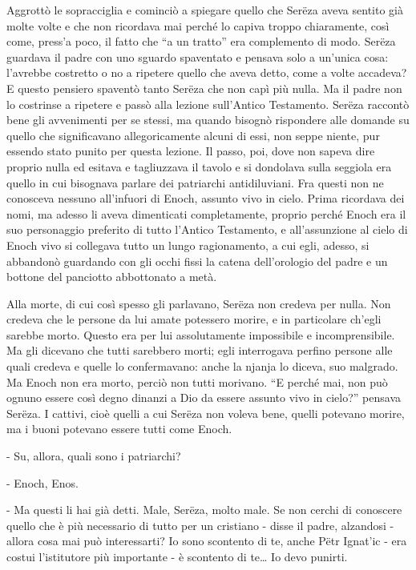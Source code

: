 Aggrottò le sopracciglia e cominciò a spiegare quello che Serëza aveva sentito già molte volte e che non ricordava mai perché lo capiva troppo chiaramente, così come, press'a poco, il fatto che ``a un tratto'' era complemento di modo. Serëza guardava il padre con uno sguardo spaventato e pensava solo a un'unica cosa: l'avrebbe costretto o no a ripetere quello che aveva detto, come a volte accadeva? E questo pensiero spaventò tanto Serëza che non capì più nulla. Ma il padre non lo costrinse a ripetere e passò alla lezione sull'Antico Testamento. Serëza raccontò bene gli avvenimenti per se stessi, ma quando bisognò rispondere alle domande su quello che significavano allegoricamente alcuni di essi, non seppe niente, pur essendo stato punito per questa lezione. Il passo, poi, dove non sapeva dire proprio nulla ed esitava e tagliuzzava il tavolo e si dondolava sulla seggiola era quello in cui bisognava parlare dei patriarchi antidiluviani. Fra questi non ne conosceva nessuno all'infuori di Enoch, assunto vivo in cielo. Prima ricordava dei nomi, ma adesso li aveva dimenticati completamente, proprio perché Enoch era il suo personaggio preferito di tutto l'Antico Testamento, e all'assunzione al cielo di Enoch vivo si collegava tutto un lungo ragionamento, a cui egli, adesso, si abbandonò guardando con gli occhi fissi la catena dell'orologio del padre e un bottone del panciotto abbottonato a metà. 

Alla morte, di cui così spesso gli parlavano, Serëza non credeva per nulla. Non credeva che le persone da lui amate potessero morire, e in particolare ch'egli sarebbe morto. Questo era per lui assolutamente impossibile e incomprensibile. Ma gli dicevano che tutti sarebbero morti; egli interrogava perfino persone alle quali credeva e quelle lo confermavano: anche la njanja lo diceva, suo malgrado. Ma Enoch non era morto, perciò non tutti morivano. ``E perché mai, non può ognuno essere così degno dinanzi a Dio da essere assunto vivo in cielo?'' pensava Serëza. I cattivi, cioè quelli a cui Serëza non voleva bene, quelli potevano morire, ma i buoni potevano essere tutti come Enoch. 

- Su, allora, quali sono i patriarchi? 

- Enoch, Enos. 

- Ma questi li hai già detti. Male, Serëza, molto male. Se non cerchi di conoscere quello che è più necessario di tutto per un cristiano - disse il padre, alzandosi - allora cosa mai può interessarti? Io sono scontento di te, anche Pëtr Ignat'ic - era costui l'istitutore più importante - è scontento di te\ldots{} Io devo punirti. 

